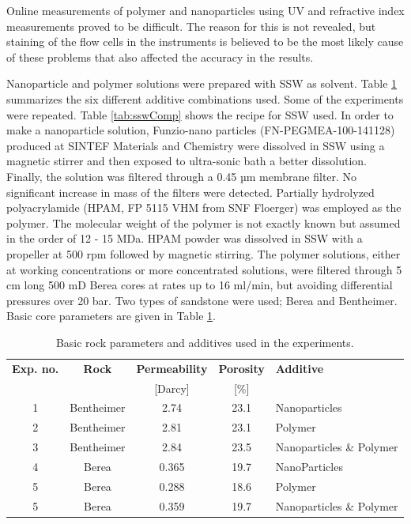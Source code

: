 Online measurements of polymer and nanoparticles using UV and refractive index measurements proved to be difficult. The reason for this is not revealed, but staining of the flow cells in the instruments is believed to be the most likely cause of these problems that also affected the accuracy in the results.

Nanoparticle and polymer solutions were prepared with  SSW as solvent. Table \ref{tab:rockParams} summarizes the six different additive combinations used. Some of the experiments were repeated. Table \ref{tab:sswComp} shows the recipe for SSW used. In order to make a nanoparticle solution, Funzio-nano particles (FN-PEGMEA-100-141128) produced at SINTEF Materials and Chemistry were dissolved in SSW using a magnetic stirrer and then exposed to ultra-sonic bath a better dissolution. Finally, the solution was filtered through a 0.45 µm membrane filter. No significant increase in mass of the filters were detected. Partially hydrolyzed polyacrylamide (HPAM, FP 5115 VHM from SNF Floerger) was employed as the polymer. The molecular weight of the polymer is not exactly known but assumed in the order of 12 - 15 MDa. HPAM powder was dissolved in SSW with a propeller at 500 rpm followed by magnetic stirring. The polymer solutions, either at working concentrations or more concentrated solutions, were filtered through 5 cm long 500 mD Berea cores at rates up to 16 ml/min, but avoiding differential pressures over 20 bar. Two types of sandstone were used; Berea and Bentheimer. Basic core parameters are given in Table \ref{tab:rockParams}.

\begin{table} 
\small
\centering
\caption{Basic rock parameters and additives used in the experiments.}
\label{tab:rockParams}
\begin{tabular}{c c c c l } 
\toprule
\textbf{Exp. no.} & \textbf{Rock} & \textbf{Permeability} & \textbf{Porosity} & \textbf{Additive} \\ 
&& [Darcy] & [\%] & \\
\midrule 
1   & Bentheimer    & 2.74 & 23.1 & Nanoparticles\\
2   & Bentheimer    & 2.81 & 23.1 & Polymer \\ 
3   & Bentheimer    & 2.84 & 23.5 & Nanoparticles \& Polymer \\ 
4   & Berea      & 0.365 & 19.7 & NanoParticles\\
5   & Berea      & 0.288 & 18.6 & Polymer \\ 
5   & Berea      & 0.359 & 19.7 & Nanoparticles \& Polymer \\ 
\bottomrule
\end{tabular}
\end{table}


